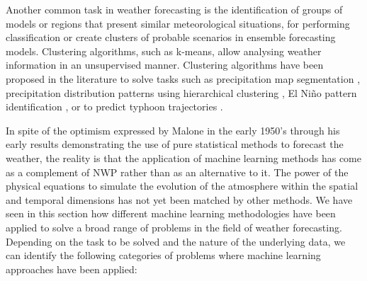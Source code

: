 \medskip

Another common task in weather forecasting is the identification of groups of models or regions that present similar meteorological situations, for performing classification or create clusters of probable scenarios in ensemble forecasting models. Clustering algorithms, such as k-means, allow analysing weather information in an unsupervised manner. Clustering algorithms have been proposed in the literature to solve tasks such as precipitation map segmentation \citep{baldwin2005automated}, precipitation distribution patterns using hierarchical clustering \citep{ramos2001hierarchical}, El Ni\~{n}o pattern identification  \citep{johnson2013enso}, or to predict typhoon trajectories \citep{camargo2007cluster}.

\medskip

In spite of the optimism expressed by Malone in the early 1950's \citep{malone1955application} through his early results demonstrating the use of pure statistical methods to forecast the weather, the reality is that the application of machine learning methods has come as a complement of NWP rather than as an alternative to it. The power of the physical equations to simulate the evolution of the atmosphere within the spatial and temporal dimensions has not yet been matched by other methods. We have seen in this section how different machine learning methodologies have been applied to solve a broad range of problems in the field of weather forecasting. Depending on the task to be solved and the nature of the underlying data, we can identify the following categories of problems where machine learning approaches have been applied:

\medskip

